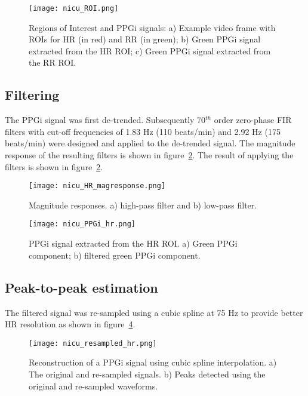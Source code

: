 \begin{center}
\begin{figure}[H]
\centering
\texttt{[image: nicu\_ROI.png]}
    \caption[Regions of Interest and PPGi signals.] {Regions of Interest and PPGi signals: a) Example video frame with ROIs for HR (in red) and RR (in green); b) Green PPGi signal extracted from the HR ROI; c) Green PPGi signal extracted from the RR ROI.} \label{ROI}
    \end{figure}
 \end{center}

\subsection{Filtering}
\label{filter exp}
The PPGi signal was first de-trended. Subsequently 70$^{th}$ order zero-phase FIR filters with cut-off frequencies of 1.83 Hz (110 beats/min) and 2.92 Hz (175 beats/min) were designed and applied to the de-trended signal. The magnitude response of the resulting filters is shown in figure~\ref{HR_mag}. The result of applying the filters is shown in figure~\ref{HR_mag}.

\begin{center}
\begin{figure}[H]
\centering
\texttt{[image: nicu\_HR\_magresponse.png]}
    \caption[Magnitude responses.] {Magnitude responses. a) high-pass filter and b) low-pass filter.}
    \label{HR_mag}
    \end{figure}
 \end{center}
 
 \begin{center}
\begin{figure}[H]
\centering
\texttt{[image: nicu\_PPGi\_hr.png]}
    \caption[PPGi signal extracted from the HR ROI.] {PPGi signal extracted from the HR ROI. a) Green PPGi component; b) filtered green PPGi component.} \label{ppghr}
    \end{figure}
 \end{center}
 
  \subsection{Peak-to-peak estimation}
 \label{peaks expl HR}
The filtered signal was re-sampled using a cubic spline at 75 Hz to provide better HR resolution as shown in figure~\ref{resahr}.
 
\begin{center}
\begin{figure}[H]
\centering
\texttt{[image: nicu\_resampled\_hr.png]}
      \caption[Reconstruction of a PPGi signal using cubic spline interpolation.] {Reconstruction of a PPGi signal using cubic spline interpolation. a) The original and re-sampled signals. b) Peaks detected using the original and re-sampled waveforms.} \label{resahr}
    \end{figure}
 \end{center}

